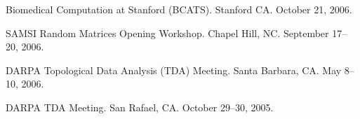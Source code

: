 \documentclass[overlapped,line,letterpaper]{res}
\begin{document}
\begin{resume}
Biomedical Computation at Stanford (BCATS). Stanford CA. October 21, 2006.

SAMSI Random Matrices Opening Workshop. Chapel Hill, NC.  September 17--20, 2006.

DARPA Topological Data Analysis (TDA) Meeting. Santa Barbara, CA. May 8--10, 2006.

DARPA TDA Meeting. San Rafael, CA. October 29--30, 2005.

%


%



\end{resume}
\end{document}
